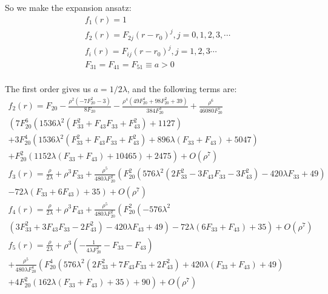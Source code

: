 \documentclass[12pt, a4paper]{article}
\numberwithin{equation}{section}
\newcommand{\be}{\begin{equation}}
\newcommand{\ee}{\end{equation}}
\begin{document}
	So we make the expansion ansatz:
\be
	\begin{aligned}
		&f_1(r) = 1&\\
		&f_2(r) = F_{2j}(r-r_0)^j, j = 0,1,2,3,\cdots&\\
		&f_i(r) = F_{ij}(r-r_0)^j, j = 1,2,3\cdots&\\
		&F_{31} = F_{41} = F_{51} \equiv a > 0&\\
	\end{aligned}
\ee

	The first order gives us $a = 1/2\lambda$, and the following terms are:
\be
	\begin{aligned}
		f_2(r) = F_{20}-\frac{\rho ^2 \left(-7 F_{20}^2-3\right)}{8 F_{20}}-\frac{\rho ^4 \left(49 F_{20}^4+98 F_{20}^2+39\right)}{384 F_{20}^3}+\frac{\rho ^6}{46080 F_{20}^5}\\
		 \left(7 F_{20}^6 \left(1536 \lambda ^2 \left(F_{33}^2+F_{43}
		F_{33}+F_{43}^2\right)+1127\right)\right.\\
	\left.	+3 F_{20}^4 \left(1536 \lambda ^2 \left(F_{33}^2+F_{43} F_{33}+F_{43}^2\right)+896 \lambda  (F_{33}+F_{43})+5047\right)\right.\\
\left.	+F_{20}^2 (1152 \lambda 
		(F_{33}+F_{43})+10465)+2475\right)+O\left(\rho ^7\right)\\
	f_3(r) = \frac{\rho }{2 \lambda }+\rho ^3 F_{33}+\frac{\rho ^5}{480 \lambda  F_{20}^2} \left(F_{20}^2 \left(576 \lambda ^2 \left(2 F_{33}^2-3 F_{43} F_{33}-3 F_{43}^2\right)-420 \lambda  F_{33}+49\right)\right.\\
\left.	-72 \lambda  (F_{33}+6
		F_{43})+35\right)+O\left(\rho ^7\right)\\
	f_4(r) = \frac{\rho }{2 \lambda }+\rho ^3 F_{43}+\frac{\rho ^5}{480 \lambda  F_{20}^2} \left(F_{20}^2 \left(-576 \lambda ^2\right.\right.\\
\left.\left.	 \left(3 F_{33}^2+3 F_{43} F_{33}-2 F_{43}^2\right)-420 \lambda  F_{43}+49\right)-72 \lambda  (6
		F_{33}+F_{43})+35\right)+O\left(\rho ^7\right)\\
	f_5(r) = \frac{\rho }{2 \lambda }+\rho ^3 \left(-\frac{1}{4 \lambda  F_{20}^2}-F_{33}-F_{43}\right)\\
	+\frac{\rho ^5}{480 \lambda  F_{20}^4} \left(F_{20}^4 \left(576 \lambda ^2 \left(2 F_{33}^2+7 F_{43} F_{33}+2 F_{43}^2\right)+420 \lambda 
		(F_{33}+F_{43})+49\right)\right.\\
	\left.	+4 F_{20}^2 (162 \lambda  (F_{33}+F_{43})+35)+90\right)+O\left(\rho ^7\right)\\
	\end{aligned}
\ee
	
\end{document}
